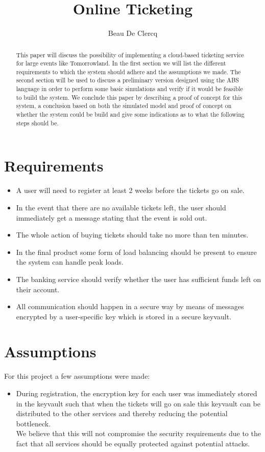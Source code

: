 \documentclass[10pt,a4paper,twocolumn]{article}
\author{Beau De Clercq}
\title{Online Ticketing}
\begin{document}
	
\maketitle	
\begin{abstract}
This paper will discuss the possibility of implementing a cloud-based ticketing service for large events like Tomorrowland. In the first section we will list the different requirements to which the system should adhere and the assumptions we made. The second section will be used to discuss a preliminary version designed using the ABS language in order to perform some basic simulations and verify if it would be feasible to build the system. We conclude this paper by describing a proof of concept for this system, a conclusion based on both the simulated model and proof of concept on whether the system could be build and give some indications as to what the following steps should be.
\end{abstract}

\section*{Requirements}
\begin{itemize}
	\item A user will need to register at least 2 weeks before the tickets go on sale.
	\item In the event that there are no available tickets left, the user should immediately get a message stating that the event is sold out.
	\item The whole action of buying tickets should take no more than ten minutes.
	\item In the final product some form of load balancing should be present to ensure the system can handle peak loads.
	\item The banking service should verify whether the user has sufficient funds left on their account.
	\item All communication should happen in a secure way by means of messages encrypted by a user-specific key which is stored in a secure keyvault.
\end{itemize}
\section{Assumptions}
For this project a few assumptions were made:
\begin{itemize}
	\item During registration, the encryption key for each user was immediately stored in the keyvault such that when the tickets will go on sale this keyvault can be distributed to the other services and thereby reducing the potential bottleneck.\\
	We believe that this will not compromise the security requirements due to the fact that all services should be equally protected against potential attacks.
\end{itemize}
\end{document}
